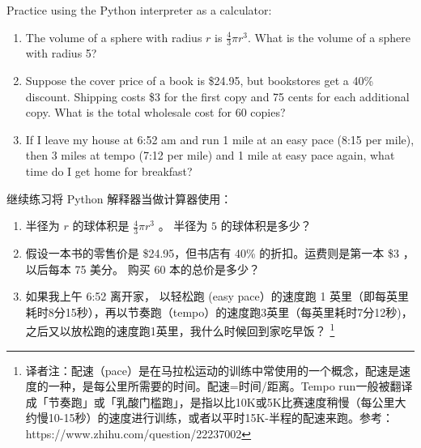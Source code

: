 %
\begin{exercise}

Practice using the Python interpreter as a calculator:

\begin{enumerate}

\item The volume of a sphere with radius $r$ is $\frac{4}{3} \pi r^3$.
  What is the volume of a sphere with radius 5?

\item Suppose the cover price of a book is \$24.95, but bookstores get a
  40\% discount.  Shipping costs \$3 for the first copy and 75 cents
  for each additional copy.  What is the total wholesale cost for
  60 copies?

\item If I leave my house at 6:52 am and run 1 mile at an easy pace
  (8:15 per mile), then 3 miles at tempo (7:12 per mile) and 1 mile at
  easy pace again, what time do I get home for breakfast?

\end{enumerate}

继续练习将 Python 解释器当做计算器使用：

\begin{enumerate}

\item 半径为 $r$ 的球体积是 $\frac{4}{3} \pi r^3$ 。 半径为 $5$ 的球体积是多少？

\item 假设一本书的零售价是 \$24.95，但书店有 40\% 的折扣。运费则是第一本 \$3 ，以后每本 75 美分。 购买 60 本的总价是多少？

\item 如果我上午 6:52 离开家， 以轻松跑 (easy pace）的速度跑 1 英里（即每英里耗时8分15秒），再以节奏跑（tempo）的速度跑3英里（每英里耗时7分12秒)，之后又以放松跑的速度跑1英里，我什么时候回到家吃早饭？ \footnote{译者注：配速（pace）是在马拉松运动的训练中常使用的一个概念，配速是速度的一种，是每公里所需要的时间。配速=时间/距离。Tempo run一般被翻译成「节奏跑」或「乳酸门槛跑」，是指以比10K或5K比赛速度稍慢（每公里大约慢10-15秒）的速度进行训练，或者以平时15K-半程的配速来跑。参考：https://www.zhihu.com/question/22237002}

\end{enumerate}

\end{exercise}